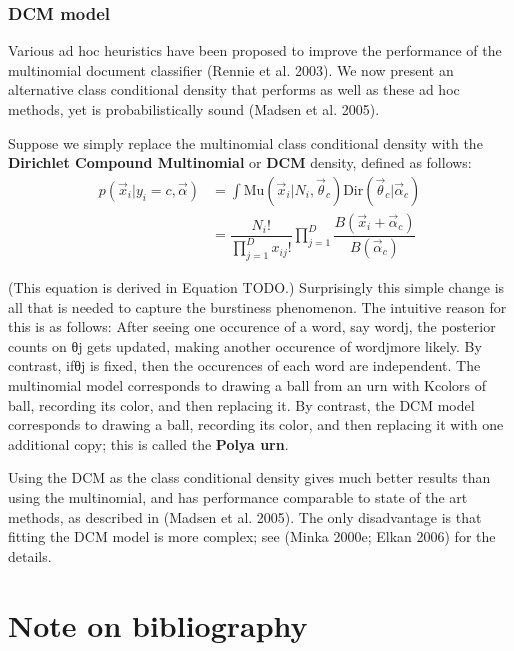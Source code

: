 \begin{refsection}
\subsubsection{DCM model}
Various ad hoc heuristics have been proposed to improve the performance of the multinomial document classifier (Rennie et al. 2003). We now present an alternative class conditional density that performs as well as these ad hoc methods, yet is probabilistically sound (Madsen et al. 2005).

Suppose we simply replace the multinomial class conditional density with the \textbf{Dirichlet Compound Multinomial} or \textbf{DCM} density, defined as follows:
\begin{equation}\begin{split}
p(\vec{x}_i|y_i=c,\vec{\alpha}) & =\int \text{Mu}(\vec{x}_i|N_i,\vec{\theta}_c)\text{Dir}(\vec{\theta}_c|\vec{\alpha}_c) \\
& =\dfrac{N_i!}{\prod_{j=1}^D x_{ij}!}\prod\limits_{j=1}^D\dfrac{B(\vec{x}_i+\vec{\alpha}_c)}{B(\vec{\alpha}_c)}
\end{split}\end{equation}

(This equation is derived in Equation TODO.) Surprisingly this simple change is all that is needed to capture the burstiness phenomenon. The intuitive reason for this is as follows: After seeing one occurence of a word, say wordj, the posterior counts on θj gets updated, making another occurence of wordjmore likely. By contrast, ifθj is fixed, then the occurences of each word are independent. The multinomial model corresponds to drawing a ball from an urn with Kcolors of ball, recording its color, and then replacing it. By contrast, the DCM model corresponds to drawing a ball, recording its color, and then replacing it with one additional copy; this is called the \textbf{Polya urn}.

Using the DCM as the class conditional density gives much better results than using the multinomial, and has performance comparable to state of the art methods, as described in (Madsen et al. 2005). The only disadvantage is that fitting the DCM model is more complex; see (Minka 2000e; Elkan 2006) for the details.



\section{Note on bibliography}







\end{refsection}

